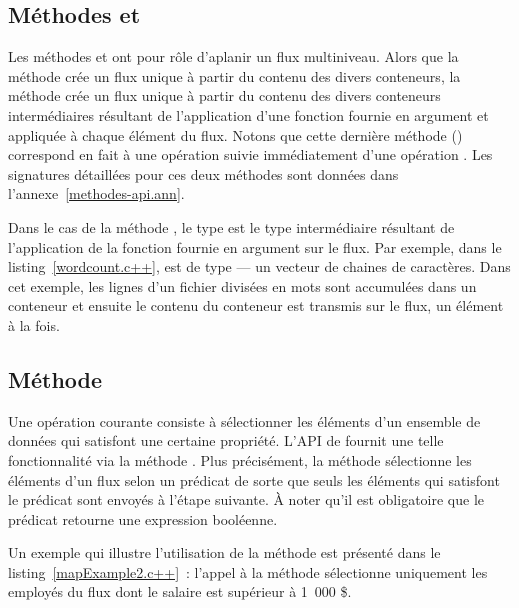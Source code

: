 \subsection{M\'ethodes  et }

Les m\'ethodes  et  ont pour r\^ole d'aplanir un flux multiniveau. Alors que la m\'ethode  cr\'ee un flux unique \`a partir du contenu des divers conteneurs, la m\'ethode  cr\'ee un flux unique \`a partir du contenu des divers conteneurs interm\'ediaires r\'esultant de l'application d'une fonction fournie en argument et appliquée \`a chaque \'el\'ement du flux. Notons que cette derni\`ere m\'ethode () correspond en fait à une op\'eration  suivie immédiatement d'une opération . Les signatures détaillées pour ces deux m\'ethodes sont donn\'ees dans l'annexe~\ref{methodes-api.ann}.


Dans le cas de la m\'ethode , le type  est le type interm\'ediaire r\'esultant de l'application de la fonction  fournie en argument sur le flux. Par exemple, dans le listing~\ref{wordcount.c++},  est de type  --- un vecteur de chaines de caract\`eres. Dans cet exemple, les lignes d'un fichier divis\'ees en mots sont accumul\'ees dans un conteneur et ensuite le contenu du conteneur est transmis sur le flux, un élément à la fois.


\subsection{M\'ethode }
Une op\'eration courante consiste \`a s\'electionner les \'el\'ements d'un ensemble de donn\'ees qui satisfont une certaine propri\'et\'e. L'API de  fournit une telle fonctionnalit\'e via la m\'ethode . Plus précisément, la m\'ethode  s\'electionne les \'el\'ements d'un flux selon un pr\'edicat de sorte que seuls les \'el\'ements qui  satisfont le pr\'edicat sont envoy\'es \`a l'\'etape suivante. \`A noter qu'il est obligatoire que le pr\'edicat retourne une expression bool\'eenne. 

Un exemple qui illustre l'utilisation de la m\'ethode  est pr\'esent\'e dans le listing~\ref{mapExample2.c++}~: l'appel \`a la m\'ethode   s\'electionne uniquement les employ\'es du flux dont le salaire est sup\'erieur \`a 1~000 \$.


